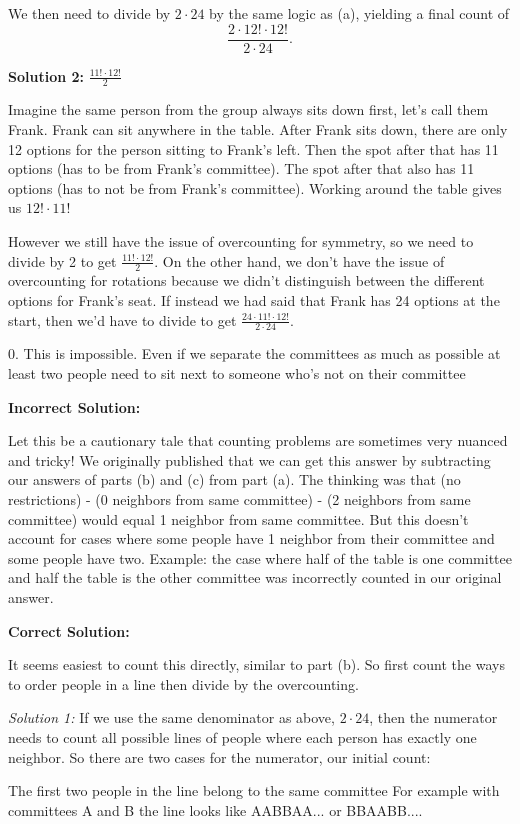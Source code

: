 \documentclass[12pt]{exam}
\begin{document}
\begin{solution}
\begin{qparts}
    We then need to divide by $2\cdot 24$ by the same logic as (a), yielding a final count of
    $$\frac{2\cdot 12!\cdot 12!}{2\cdot 24}.$$
    
    \textbf{Solution 2:} $\frac{11! \cdot 12!}{2}$
    
    Imagine the same person from the group always sits down first, let's call them Frank. Frank can sit anywhere in the table. After Frank sits down, there are only 12 options for the person sitting to Frank's left. Then the spot after that has 11 options (has to be from Frank's committee). The spot after that also has 11 options (has to not be from Frank's committee). Working around the table gives us $12!\cdot 11!$ 
    
    However we still have the issue of overcounting for symmetry, so we need to divide by 2 to get $\frac{11! \cdot 12!}{2}.$ On the other hand, we don't have the issue of overcounting for rotations because we didn't distinguish between the different options for Frank's seat. If instead we had said that Frank has 24 options at the start, then we'd have to divide to get $\frac{24\cdot 11!\cdot 12!}{2\cdot 24}.$
    
    \item 0. This is impossible. Even if we separate the committees as much as possible at least two people need to sit next to someone who's not on their committee 
    
    \item \textbf{Incorrect Solution:}
    
    Let this be a cautionary tale that counting problems are sometimes very nuanced and tricky! We originally published that we can get this answer by subtracting our answers of parts (b) and (c) from part (a). The thinking was that (no restrictions) - (0 neighbors from same committee) - (2 neighbors from same committee) would equal 1 neighbor from same committee. But this doesn't account for cases where some people have 1 neighbor from their committee and some people have two. Example: the case where half of the table is one committee and half the table is the other committee was incorrectly counted in our original answer.
    
    \textbf{Correct Solution:}
    
    It seems easiest to count this directly, similar to part (b). So first count the ways to order people in a line then divide by the overcounting. 
    
    \emph{Solution 1:} If we use the same denominator as above, $2\cdot 24$, then the numerator needs to count all possible lines of people where each person has exactly one neighbor. So there are two cases for the numerator, our initial count:
    \begin{stmts}
        \item The first two people in the line belong to the same committee For example with committees A and B the line looks like AABBAA... or BBAABB....


\end{stmts}
\end{qparts}
\end{solution}
\end{document}
